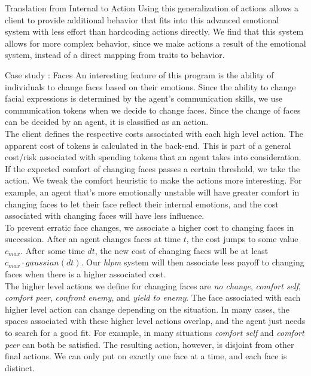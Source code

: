 \documentclass[11pt]{article}
\begin{document}
\begin{section}{Translation from Internal to Action}
Using this generalization of actions allows a client to provide additional behavior that fits into this advanced emotional system with less effort than hardcoding actions directly. We find that this system allows for more complex behavior, since we make actions a result of the emotional system, instead of a direct mapping from traits to behavior.\\

\begin{subsection}{Case study : Faces}
An interesting feature of this program is the ability of individuals to change faces based on their emotions. Since the ability to change facial expressions is determined by the agent's communication skills, we use communication tokens when we decide to change faces. Since the change of faces can be decided by an agent, it is classified as an action. \\

The client defines the respective costs associated with each high level action. The apparent cost of tokens is calculated in the back-end. This is part of a general cost/risk associated with spending tokens that an agent takes into consideration. If the expected comfort of changing faces passes a certain threshold, we take the action. We tweak the comfort heuristic to make the actions more interesting. For example, an agent that's more emotionally unstable will have greater comfort in changing faces to let their face reflect their internal emotions, and the cost associated with changing faces will have less influence.\\

To prevent erratic face changes, we associate a higher cost to changing faces in succession. After an agent changes faces at time $t$, the cost jumps to some value $c_{max}$. After some time $dt$, the new cost of changing faces will be at least $c_{max} \cdot gaussian(dt)$. Our \emph{hlpm} system will then associate less payoff to changing faces when there is a higher associated cost.\\

The higher level actions we define for changing faces are \emph{no change}, \emph{comfort self}, \emph{comfort peer}, \emph{confront enemy}, and \emph{yield to enemy}. The face associated with each higher level action can change depending on the situation. In many cases, the spaces associated with these higher level actions overlap, and the agent just needs to search for a good fit. For example, in many situations \emph{comfort self} and \emph{comfort peer} can both be satisfied. The resulting action, however, is disjoint from other final actions. We can only put on exactly one face at a time, and each face is distinct.\\


\end{subsection}
\end{section}
\end{document}
